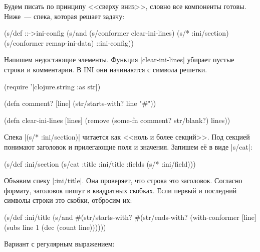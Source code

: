 Будем писать по принципу <<сверху вниз>>, словно все компоненты готовы. Ниже~---
спека, которая решает задачу:

\begin{english}
  \begin{clojure}
(s/def ::->ini-config
  (s/and
   (s/conformer clear-ini-lines)
   (s/* :ini/section)
   (s/conformer remap-ini-data)
   ::ini-config))
  \end{clojure}
\end{english}


Напишем недостающие элементы. Функция \spverb|clear-ini-lines| убирает пустые
строки и комментарии. В INI они начинаются с символа решетки.

\begin{english}
  \begin{clojure}
(require '[clojure.string :as str])

(defn comment? [line]
  (str/starts-with? line "#"))

(defn clear-ini-lines [lines]
  (remove (some-fn comment? str/blank?) lines))
  \end{clojure}
\end{english}


Спека \spverb|(s/* :ini/section)| читается как <<ноль и более секций>>. Под
секцией понимают заголовок и прилегающие поля и значения. Запишем е\"{е} в виде
\spverb|s/cat|:

\begin{english}
  \begin{clojure}
(s/def :ini/section
  (s/cat :title :ini/title :fields (s/* :ini/field)))
  \end{clojure}
\end{english}

Объявим спеку \spverb|:ini/title|. Она проверяет, что строка это
заголовок. Согласно формату, заголовок пишут в квадратных скобках. Если первый и
последний символы строки это скобки, отбросим их:

\begin{english}
  \begin{clojure}
(s/def :ini/title
  (s/and
   #(str/starts-with? %
   #(str/ends-with? %
   (with-conformer [line]
     (subs line 1 (dec (count line))))))
  \end{clojure}
\end{english}

\noindent
Вариант с регулярным выражением:

